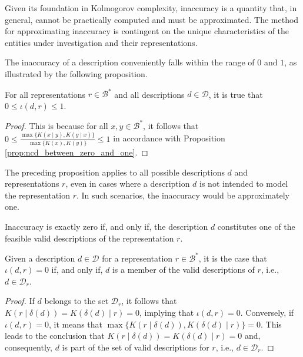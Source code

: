Given its foundation in Kolmogorov complexity, inaccuracy is a quantity that, in general, cannot be practically computed and must be approximated. The method for approximating inaccuracy is contingent on the unique characteristics of the entities under investigation and their representations.

The inaccuracy of a description conveniently falls within the range of $0$ and $1$, as illustrated by the following proposition.

\begin{proposition}
\label{prop:inaccuracy:inaccuracy:range}
For all representations $r \in \mathcal{B}^\ast$ and all descriptions $d \in \mathcal{D}$, it is true that $0 \leq \iota(d, r) \leq 1$.
\end{proposition}
\begin{proof}
This is because for all $x, y \in \mathcal{B}^\ast$, it follows that $0 \leq \frac{ \max\{ K(x \mid y), K(y \mid x) \} } { \max\{ K(x), K(y) \} } \leq 1$ in accordance with Proposition \ref{prop:ncd_between_zero_and_one}.
\end{proof}

The preceding proposition applies to all possible descriptions $d$ and representations $r$, even in cases where a description $d$ is not intended to model the representation $r$. In such scenarios, the inaccuracy would be approximately one.

Inaccuracy is exactly zero if, and only if, the description $d$ constitutes one of the feasible valid descriptions of the representation $r$.

\begin{proposition}
\label{prop:perfect_description}
Given a description $d \in \mathcal{D}$ for a representation $r \in \mathcal{B}^\ast$, it is the case that $\iota(d, r) = 0$ if, and only if, $d$ is a member of the valid descriptions of $r$, i.e., $d \in \mathcal{D}_r$.
\end{proposition}
\begin{proof}
If $d$ belongs to the set $\mathcal{D}_r$, it follows that $K \left( r \mid \delta(d) \right) = K \left( \delta(d) \mid r \right) = 0$, implying that $\iota(d, r) = 0$. Conversely, if $\iota(d, r) = 0$, it means that $\max\{ K \left( r \mid \delta(d) \right), K \left( \delta(d) \mid r \right) \} = 0$. This leads to the conclusion that $K \left( r \mid \delta(d) \right) = K \left( \delta(d) \mid r \right) = 0$ and, consequently, $d$ is part of the set of valid descriptions for $r$, i.e., $d \in \mathcal{D}_r$.
\end{proof}

